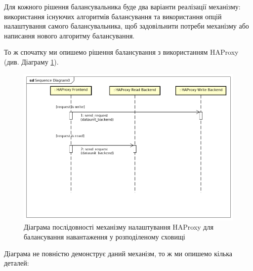 \documentclass[14pt]{vakthesis}
\begin{document}
Для кожного рішення балансувальника буде два варіанти реалізації механізму: використання існуючих алгоритмів балансування та використання опцій налаштування самого балансувальника, щоб задовільнити потреби механізму або написання нового алгоритму балансування.

\noindent То ж спочатку ми опишемо рішення балансування з використанням HAProxy (див. Діаграму \ref{fig:d_sequence_lb_configuration}). 

\begin{figure}
\centering

\includegraphics[width=\linewidth]{images/Sequence_Diagram_haproxy.png}
     \caption{Діаграма 	послідовності механізму налаштування HAProxy для балансування навантаження у розподіленому сховищі}
     \label{fig:d_sequence_lb_configuration}
\end{figure}

Діаграма не повністю демонструє даний механізм, то ж ми опишемо кілька деталей:
\end{document}
